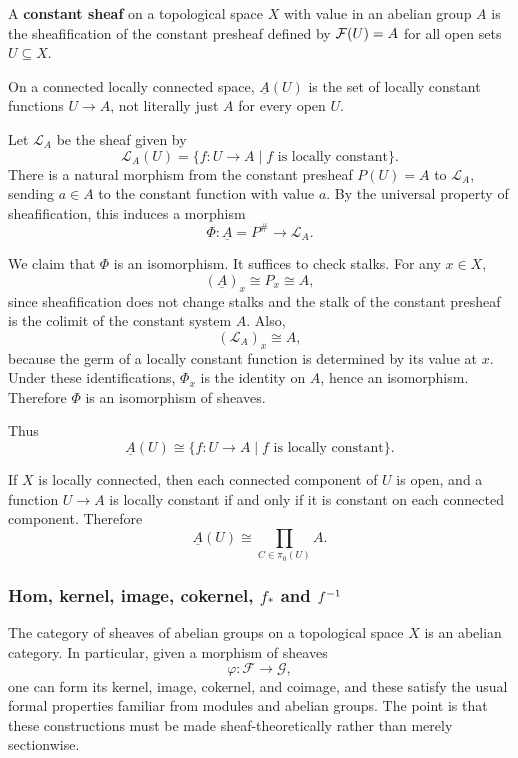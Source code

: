 \documentclass[12pt]{article}
\begin{document}
\begin{definition}
    A \textbf{constant sheaf} on a topological space $X$ with value in an abelian group $A$ is the sheafification of the constant presheaf defined by ${\mathcal{F}}(U) = A$ for all open sets $U \subseteq X$.
\end{definition}

\begin{exercise}
    On a connected locally connected space, $\underline{A}(U)$ is the set of locally constant functions $U \to A$, not literally just $A$ for every open $U$.
\end{exercise}

\begin{solution}
    Let $\mathcal L_A$ be the sheaf given by
    \[
        \mathcal L_A(U)=\{f:U\to A \mid f \text{ is locally constant}\}.
    \]
    There is a natural morphism from the constant presheaf $P(U)=A$ to $\mathcal L_A$, sending $a\in A$ to the constant function with value $a$. By the universal property of sheafification, this induces a morphism
    \[
        \Phi:\underline A=P^\#\to \mathcal L_A.
    \]

    We claim that $\Phi$ is an isomorphism. It suffices to check stalks. For any $x\in X$,
    \[
        (\underline A)_x \cong P_x \cong A,
    \]
    since sheafification does not change stalks and the stalk of the constant presheaf is the colimit of the constant system $A$. Also,
    \[
        (\mathcal L_A)_x \cong A,
    \]
    because the germ of a locally constant function is determined by its value at $x$. Under these identifications, $\Phi_x$ is the identity on $A$, hence an isomorphism. Therefore $\Phi$ is an isomorphism of sheaves.

    Thus
    \[
        \underline A(U)\cong \{f:U\to A \mid f \text{ is locally constant}\}.
    \]

    If $X$ is locally connected, then each connected component of $U$ is open, and a function $U\to A$ is locally constant if and only if it is constant on each connected component. Therefore
    \[
        \underline A(U)\cong \prod_{C\in\pi_0(U)} A.
    \]
\end{solution}

\subsubsection{Hom, kernel, image, cokernel, $f_*$ and ${f}^{-1}$}

The category of sheaves of abelian groups on a topological space $X$ is an abelian category. In particular, given a morphism of sheaves
\[
    \varphi : \mathcal F \to \mathcal G,
\]
one can form its kernel, image, cokernel, and coimage, and these satisfy the usual formal properties familiar from modules and abelian groups. The point is that these constructions must be made sheaf-theoretically rather than merely sectionwise.
\end{document}
